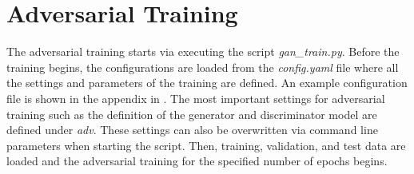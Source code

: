 \section{Adversarial Training}
\label{sec:adv_training}
%
The adversarial training starts via executing the script \textit{gan\_train.py}.
Before the training begins, the configurations are loaded from the \textit{config.yaml} file where all the settings and parameters of the training are defined.
An example configuration file is shown in the appendix in .
The most important settings for adversarial training such as the definition of the generator and discriminator model are defined under \textit{adv}.
These settings can also be overwritten via command line parameters when starting the script.
Then, training, validation, and test data are loaded and the adversarial training for the specified number of epochs begins.

